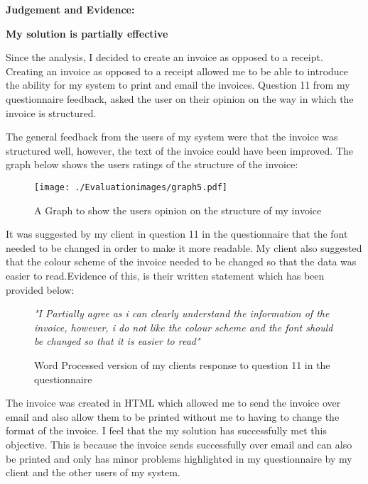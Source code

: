 \textbf{Judgement and Evidence:} \newline

\textbf{\large{My solution is partially effective}}

Since the analysis, I decided to create an invoice as opposed to a receipt. Creating an invoice as opposed to a receipt allowed me to be able to introduce the ability for my system to print and email the invoices. Question 11 from my questionnaire feedback, asked the user on their opinion on the way in which the invoice is structured. 

The general feedback from the users of my system were that the invoice was structured well, however, the text of the invoice could have been improved. The graph below shows the users ratings of the structure of the invoice:

\begin{figure}[H]
\caption{A Graph to show the users opinion on the structure of my invoice} \label{graph5}
\hfill\texttt{[image: ./Evaluationimages/graph5.pdf]}
\end{figure}


It was suggested by my client in question 11 in the questionnaire that the font needed to be changed in order to make it more readable. My client also suggested that the colour scheme of the invoice needed to be changed so that the data was easier to read.Evidence of this, is their written statement which has been provided below:

\begin{figure}[H]
\caption{Word Processed version of my clients response to question 11 in the questionnaire} \label{client-evidence-Q3}
\vspace{3mm}
\textit{\large{"I Partially agree as i can clearly understand the information of the invoice, however, i do not like the colour scheme and the font should be changed so that it is easier to read"}}
\vspace{3mm}
\end{figure}

The invoice was created in HTML which allowed me to send the invoice over email and also allow them to be printed without me to having to change the format of the invoice. I feel that the my solution has successfully met this objective. This is because the invoice sends successfully over email and can also be printed and only has minor problems highlighted in my questionnaire by my client and the other users of my system.




